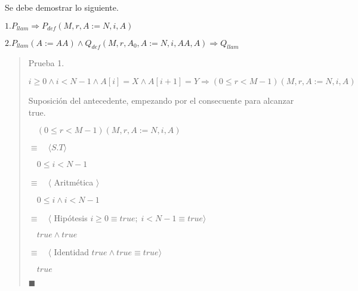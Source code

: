 \documentclass[hidelinks]{article}
\newenvironment{absolutelynopagebreak}
{\Needspace{10\baselineskip}\begin{quote}}
		{\end{quote}}
\begin{document}
Se debe demostrar lo siguiente.\par
$1. P_{llam} \Rightarrow P_{def}(M,r,A := N, i, A)$\par
$2. P_{llam}(A := AA) \land Q_{def}(M, r, A_0, A := N, i, AA, A) \Rightarrow Q_{llam}$\par
\begin{absolutelynopagebreak}
	Prueba 1.\par
	$i \geq 0 \land i < N - 1 \land A[i] = X \land A[i+1] = Y \Rightarrow (0 \leq r < M - 1)(M,r,A := N, i, A)$\par

	Suposición del antecedente, empezando por el consecuente para alcanzar true.\par
	$\quad (0 \leq r < M - 1)(M,r,A := N, i, A)$\par
	$\equiv \quad \langle S.T \rangle$\par
	$\quad 0 \leq i < N - 1$\par
	$\equiv \quad \langle$ Aritmética $ \rangle$\par
	$\quad 0 \leq i \land i < N - 1$\par
	$\equiv \quad \langle$ Hipótesis $ i \geq 0 \equiv true; \; i < N - 1 \equiv true \rangle$\par
	$\quad true \land true$\par
	$\equiv \quad \langle$ Identidad $ true \land true \equiv true \rangle$\par
	$\quad true$\par
	$\blacksquare$\par
\end{absolutelynopagebreak}
\end{document}
